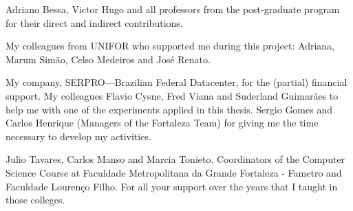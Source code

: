 Adriano Bessa, Victor Hugo and all professors from the post-graduate program for their direct and indirect contributions.

My colleagues from UNIFOR who supported me during this project: Adriana, Marum Simão, Celso Medeiros and José Renato. 

My company, SERPRO—Brazilian Federal Datacenter, for the (partial) financial support. My colleagues Flavio Cysne, Fred Viana and Suderland Guimarães to help me with one of the experiments applied in this thesis. Sergio Gomes and Carlos Henrique (Managers of the Fortaleza Team) for giving me the time necessary to develop my activities.

Julio Tavares, Carlos Manso and Marcia Tonieto. Coordinators of the Computer Science Course at
Faculdade Metropolitana da Grande Fortaleza - Fametro and Faculdade Lourenço Filho. For all your support over the years that I taught in those colleges.


